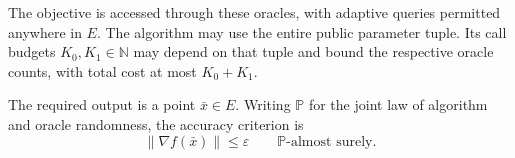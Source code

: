 \documentclass[10pt]{article}
\theoremstyle{definition}
\begin{document}
The objective is accessed through these oracles, with adaptive queries permitted anywhere in $E$. The algorithm may use the entire public parameter tuple. Its call budgets $K_0,K_1\in\mathbb{N}$ may depend on that tuple and bound the respective oracle counts, with total cost at most $K_0+K_1$.

The required output is a point $\bar{x}\in E$. Writing $\mathbb{P}$ for the joint law of algorithm and oracle randomness, the accuracy criterion is
\[
\|\nabla f(\bar{x})\|\leq\varepsilon
\qquad\mathbb{P}\text{-almost surely}.
\]
\end{document}
